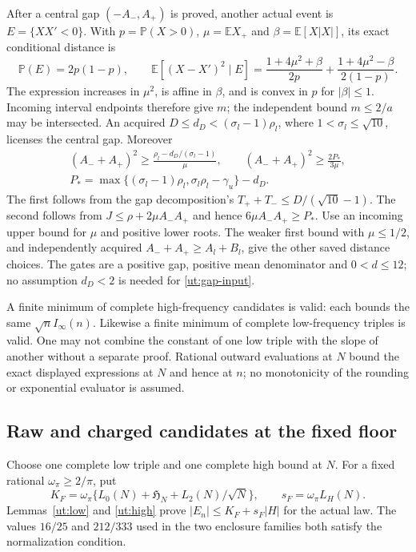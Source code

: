 \documentclass[aop,preprint]{imsart}
\theoremstyle{definition}
\newcommand{\E}{\mathbb E}
\newcommand{\PP}{\mathbb P}
\numberwithin{equation}{section}
\begin{document}
After a central gap $(-A_-,A_+)$ is proved, another actual event is
$E=\{XX'<0\}$. With $p=\PP(X>0)$, $\mu=\E X_+$ and
$\beta=\E[X|X|]$, its exact conditional distance is
\[
 \PP(E)=2p(1-p),\qquad
 \E[(X-X')^2\mid E]
 =\frac{1+4\mu^2+\beta}{2p}
  +\frac{1+4\mu^2-\beta}{2(1-p)}.
\]
The expression increases in $\mu^2$, is affine in $\beta$, and is
convex in $p$ for $|\beta|\le1$. Incoming interval endpoints
therefore give $m$; the independent bound $m\le2/a$ may be intersected.
An acquired $D\le d_D<(\sigma_l-1)\rho_l$, where
$1<\sigma_l\le\sqrt{10}$, licenses the central gap. Moreover
\begin{equation}\label{ut:gap-input}
\begin{gathered}
 (A_-+A_+)^2\ge\frac{\rho_l-d_D/(\sigma_l-1)}{\mu},\qquad
 (A_-+A_+)^2\ge\frac{2P_*}{3\mu},\\
 P_* =\max\{(\sigma_l-1)\rho_l,\sigma_l\rho_l-\gamma_u\}-d_D.
\end{gathered}
\end{equation}
The first follows from the gap decomposition's
$T_++T_-\le D/(\sqrt{10}-1)$.
The second follows from
$J\le\rho+2\mu A_-A_+$ and hence $6\mu A_-A_+\ge P_*$.
Use an incoming upper bound for $\mu$ and positive lower roots.
The weaker first bound with $\mu\le1/2$, and independently acquired
$A_-+A_+\ge A_l+B_l$, give the other saved distance choices.
The gates are a positive gap, positive mean denominator and $0<d\le12$;
no assumption $d_D<2$ is needed for \eqref{ut:gap-input}.

A finite minimum of complete high-frequency candidates is valid:
each bounds the same $\sqrt n I_\infty(n)$.
Likewise a finite minimum of complete low-frequency triples is valid.
One may not combine the constant of one low triple with the slope of
another without a separate proof. Rational outward evaluations at
$N$ bound the exact displayed expressions at $N$ and hence at $n$;
no monotonicity of the rounding or exponential evaluator is assumed.

\subsection{Raw and charged candidates at the fixed floor}

Choose one complete low triple and one complete high bound at $N$.
For a fixed rational $\omega_\pi\ge2/\pi$, put
\begin{equation}\label{ut:fourier-floor}
 K_F=\omega_\pi\{L_0(N)+\mathfrak H_N+L_2(N)/\sqrt N\},
 \qquad s_F=\omega_\pi L_H(N).
\end{equation}
Lemmas~\ref{ut:low} and \ref{ut:high} prove
$|E_n|\le K_F+s_F|H|$ for the actual law.
The values $16/25$ and $212/333$ used in the two enclosure families
both satisfy the normalization condition.
\end{document}
